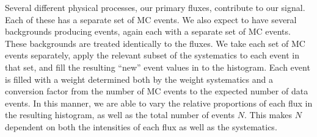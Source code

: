 
Several different physical processes, our primary fluxes, contribute
to our signal.  Each of these has a separate set of MC events.  We
also expect to have several backgrounds producing events, again each
with a separate set of MC events.  These backgrounds are treated
identically to the fluxes.  We take each set of MC events separately,
apply the relevant subset of the systematics to each event in that
set, and fill the resulting ``new'' event values in to the histogram.
Each event is filled with a weight determined both by the weight
systematics and a conversion factor from the number of MC events to
the expected number of data events.  In this manner, we are able to
vary the relative proportions of each flux in the resulting histogram,
as well as the total number of events $N$.  This makes $N$ dependent
on both the intensities of each flux as well as the systematics.

